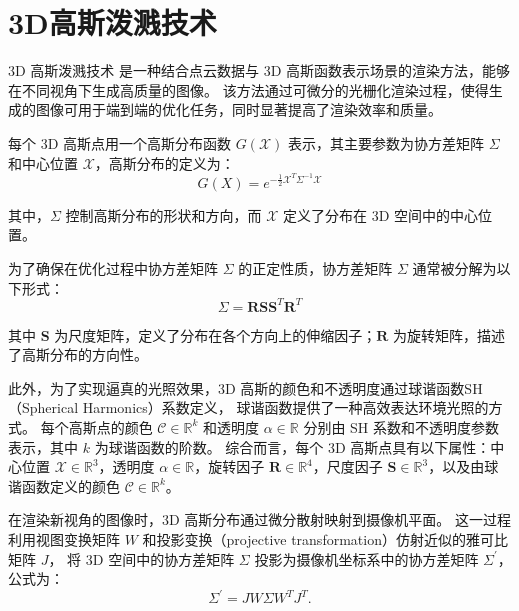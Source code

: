 
\section{3D高斯泼溅技术}
3D 高斯泼溅技术 \cite{3DGS} 是一种结合点云数据与 3D 高斯函数表示场景的渲染方法，能够在不同视角下生成高质量的图像。
该方法通过可微分的光栅化渲染过程，使得生成的图像可用于端到端的优化任务，同时显著提高了渲染效率和质量。

每个 3D 高斯点用一个高斯分布函数 $G(\mathcal{X})$ 表示，其主要参数为协方差矩阵 $\Sigma$ 和中心位置 $\mathcal{X}$，高斯分布的定义为：
\begin{equation}
\label{formula:gaussian's formula}
    G(X)=e^{-\frac{1}{2}\mathcal{X}^T\Sigma^{-1}\mathcal{X}}
\end{equation}

其中，$\Sigma$ 控制高斯分布的形状和方向，而 $\mathcal{X}$ 定义了分布在 3D 空间中的中心位置。

为了确保在优化过程中协方差矩阵 $\Sigma$ 的正定性质，协方差矩阵 $\Sigma$ 通常被分解为以下形式：
\begin{equation}
\label{formula:covariance decomposition}
    \Sigma = \mathbf{R}\mathbf{S}\mathbf{S}^T\mathbf{R}^T
\end{equation}

其中 $\mathbf{S}$ 为尺度矩阵，定义了分布在各个方向上的伸缩因子；$\mathbf{R}$ 为旋转矩阵，描述了高斯分布的方向性。

此外，为了实现逼真的光照效果，3D 高斯的颜色和不透明度通过球谐函数SH（Spherical Harmonics）系数定义，
球谐函数提供了一种高效表达环境光照的方式。
每个高斯点的颜色 $\mathcal{C} \in \mathbb{R}^k$ 和透明度 $\alpha \in \mathbb{R}$ 分别由 SH 系数和不透明度参数表示，其中 $k$ 为球谐函数的阶数。
综合而言，每个 3D 高斯点具有以下属性：中心位置 $\mathcal{X} \in \mathbb{R}^3$，透明度 $\alpha \in \mathbb{R}$，旋转因子 $\mathbf{R} \in \mathbb{R}^4$，尺度因子 $\mathbf{S} \in \mathbb{R}^3$，以及由球谐函数定义的颜色 $\mathcal{C} \in \mathbb{R}^k$。

在渲染新视角的图像时，3D 高斯分布通过微分散射\cite{differential_splatting}映射到摄像机平面。
这一过程利用视图变换矩阵 $W$ 和投影变换（projective transformation）仿射近似的雅可比矩阵 $J$，
将 3D 空间中的协方差矩阵 $\Sigma$ 投影为摄像机坐标系中的协方差矩阵 $\Sigma^{\prime}$，公式为：
\begin{equation}
    \Sigma^{\prime} = JW\Sigma W^TJ^T.
\end{equation} 

